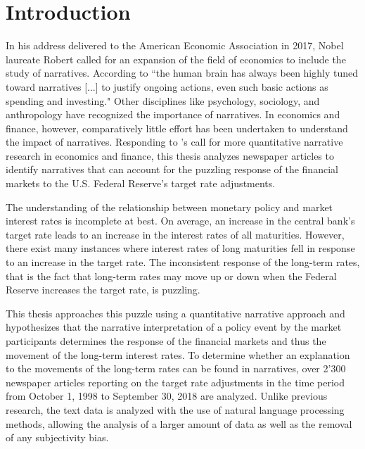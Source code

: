 \documentclass[11pt,a4paper,english,oneside]{book}
\numberwithin{equation}{chapter}
\begin{document}
\chapter{Introduction}
In his address delivered to the American Economic Association in 2017, Nobel laureate Robert \citeauthor{Shiller.2017} called for an expansion of the field of economics to include the study of narratives. According to \citeauthor{Shiller.2017} ``the human brain has always been highly tuned toward narratives [...] to justify ongoing actions, even such basic actions as spending and investing." Other disciplines like psychology, sociology, and anthropology have recognized the importance of narratives. In economics and finance, however, comparatively little effort has been undertaken to understand the impact of narratives. Responding to \citeauthor{Shiller.2017}'s call for more quantitative narrative research in economics and finance, this thesis analyzes newspaper articles to identify narratives that can account for the puzzling response of the financial markets to the U.S. Federal Reserve's target rate adjustments. 

The understanding of the relationship between monetary policy and market interest rates is incomplete at best. On average, an increase in the central bank's target rate leads to an increase in the interest rates of all maturities. However, there exist many instances where interest rates of long maturities fell in response to an increase in the target rate. The inconsistent response of the long-term rates, that is the fact that long-term rates may move up or down when the Federal Reserve increases the target rate, is puzzling.

This thesis approaches this puzzle using a quantitative narrative approach and hypothesizes that the narrative interpretation of a policy event by the market participants determines the response of the financial markets and thus the movement of the long-term interest rates. To determine whether an explanation to the movements of the long-term rates can be found in narratives, over 2'300 newspaper articles reporting on the target rate adjustments in the time period from October 1, 1998 to September 30, 2018 are analyzed. Unlike previous research, the text data is analyzed with the use of natural language processing methods, allowing the analysis of a larger amount of data as well as the removal of any subjectivity bias. 
\end{document}
